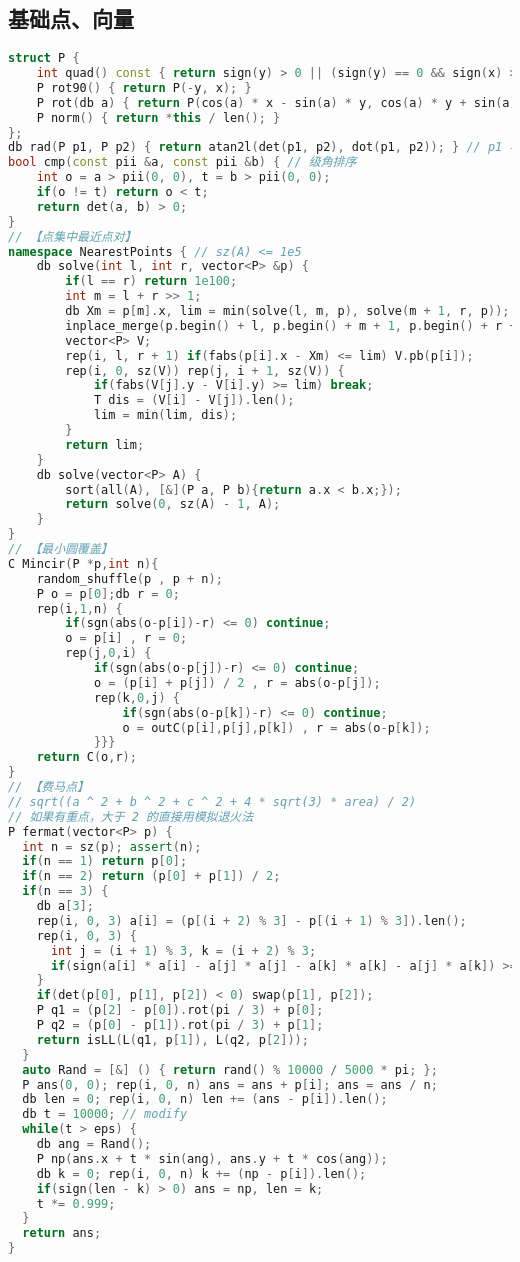 \subsection{基础点、向量}
\begin{lstlisting}[language=C++]
struct P {
	int quad() const { return sign(y) > 0 || (sign(y) == 0 && sign(x) >= 0); }
	P rot90() { return P(-y, x); }
	P rot(db a) { return P(cos(a) * x - sin(a) * y, cos(a) * y + sin(a) * x); }
	P norm() { return *this / len(); }
};
db rad(P p1, P p2) { return atan2l(det(p1, p2), dot(p1, p2)); } // p1 与 p2 的夹角，有方向
bool cmp(const pii &a, const pii &b) { // 级角排序
	int o = a > pii(0, 0), t = b > pii(0, 0);
	if(o != t) return o < t;
	return det(a, b) > 0;
}
// 【点集中最近点对】
namespace NearestPoints { // sz(A) <= 1e5
	db solve(int l, int r, vector<P> &p) {
		if(l == r) return 1e100;
		int m = l + r >> 1;
		db Xm = p[m].x, lim = min(solve(l, m, p), solve(m + 1, r, p));
		inplace_merge(p.begin() + l, p.begin() + m + 1, p.begin() + r + 1, [&](P a, P b){return a.y < b.y;});
		vector<P> V;
		rep(i, l, r + 1) if(fabs(p[i].x - Xm) <= lim) V.pb(p[i]);
		rep(i, 0, sz(V)) rep(j, i + 1, sz(V)) {
			if(fabs(V[j].y - V[i].y) >= lim) break;
			T dis = (V[i] - V[j]).len();
			lim = min(lim, dis);
		}
		return lim;
	}
	db solve(vector<P> A) {
		sort(all(A), [&](P a, P b){return a.x < b.x;});
		return solve(0, sz(A) - 1, A);
	}
}
// 【最小圆覆盖】
C Mincir(P *p,int n){ 
	random_shuffle(p , p + n);
	P o = p[0];db r = 0;
	rep(i,1,n) {
		if(sgn(abs(o-p[i])-r) <= 0) continue;
		o = p[i] , r = 0;
		rep(j,0,i) {
			if(sgn(abs(o-p[j])-r) <= 0) continue;
			o = (p[i] + p[j]) / 2 , r = abs(o-p[j]);
			rep(k,0,j) {
				if(sgn(abs(o-p[k])-r) <= 0) continue;
				o = outC(p[i],p[j],p[k]) , r = abs(o-p[k]);
			}}}
	return C(o,r);
}
// 【费马点】
// sqrt((a ^ 2 + b ^ 2 + c ^ 2 + 4 * sqrt(3) * area) / 2)
// 如果有重点，大于 2 的直接用模拟退火法
P fermat(vector<P> p) {
  int n = sz(p); assert(n);
  if(n == 1) return p[0];
  if(n == 2) return (p[0] + p[1]) / 2;
  if(n == 3) {
    db a[3];
    rep(i, 0, 3) a[i] = (p[(i + 2) % 3] - p[(i + 1) % 3]).len();
    rep(i, 0, 3) {
      int j = (i + 1) % 3, k = (i + 2) % 3;
      if(sign(a[i] * a[i] - a[j] * a[j] - a[k] * a[k] - a[j] * a[k]) >= 0) return p[i];
    }
    if(det(p[0], p[1], p[2]) < 0) swap(p[1], p[2]);
    P q1 = (p[2] - p[0]).rot(pi / 3) + p[0]; 
    P q2 = (p[0] - p[1]).rot(pi / 3) + p[1];
    return isLL(L(q1, p[1]), L(q2, p[2]));
  }
  auto Rand = [&] () { return rand() % 10000 / 5000 * pi; };
  P ans(0, 0); rep(i, 0, n) ans = ans + p[i]; ans = ans / n;
  db len = 0; rep(i, 0, n) len += (ans - p[i]).len();
  db t = 10000; // modify
  while(t > eps) {
    db ang = Rand();
    P np(ans.x + t * sin(ang), ans.y + t * cos(ang));
    db k = 0; rep(i, 0, n) k += (np - p[i]).len();
    if(sign(len - k) > 0) ans = np, len = k;
    t *= 0.999;
  }
  return ans;
}
\end{lstlisting}
